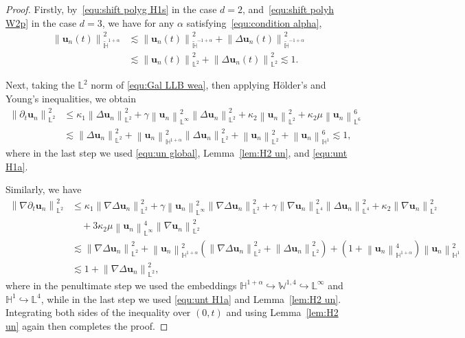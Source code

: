 \documentclass[11pt,reqno]{amsart}
\theoremstyle{definition}
\numberwithin{equation}{section}
\newcommand{\bff}{\boldsymbol}
\newcommand{\bb}{\mathbb}
\newcommand{\leqs}{\lesssim}
\newcommand{\pa}{\partial}
\newcommand{\nn}{\nonumber}
\newcommand{\norm}[2]{\left\|{#1}\right\|_{#2}}
\begin{document}
\begin{proof}
Firstly, by~\eqref{equ:shift polyg H1s} in the case $d=2$, and~\eqref{equ:shift polyh W2p} in the case $d=3$, we have for any $\alpha$ satisfying~\eqref{equ:condition alpha},
\begin{align}\label{equ:unt H1a}
	\norm{\bff{u}_n(t)}{\widetilde{\bb{H}}^{1+\alpha}}^2
	&\lesssim 
	\norm{\bff{u}_n(t)}{\widetilde{\bb{H}}^{-1+\alpha}}^2
	+
	\norm{\Delta \bff{u}_n(t)}{\widetilde{\bb{H}}^{-1+\alpha}}^2
	\nn\\
	&\lesssim
	\norm{\bff{u}_n(t)}{\bb{L}^2}^2
	+
	\norm{\Delta \bff{u}_n(t)}{\bb{L}^2}^2
	\leqs 1.
\end{align}

Next, taking the $\bb{L}^2$ norm of \eqref{equ:Gal LLB wea}, then applying H\"older's and Young's inequalities, we obtain
\begin{align*}
	\norm{\pa_t \bff{u}_n}{\bb{L}^2}^2
	&\leq
	\kappa_1 \norm{\Delta \bff{u}_n}{\bb{L}^2}^2
	+
	\gamma \norm{\bff{u}_n}{\bb{L}^\infty}^2 \norm{\Delta \bff{u}_n}{\bb{L}^2}^2
	+
	\kappa_2 \norm{\bff{u}_n}{\bb{L}^2}^2
	+
	\kappa_2 \mu \norm{\bff{u}_n}{\bb{L}^6}^6
	\\
	&\leqs
	\norm{\Delta \bff{u}_n}{\bb{L}^2}^2 + \norm{\bff{u}_n}{\bb{H}^{1+\alpha}}^2 \norm{\Delta \bff{u}_n}{\bb{L}^2}^2
	+ \norm{\bff{u}_n}{\bb{L}^2}^2 + \norm{\bff{u}_n}{\bb{H}^1}^6
	\leqs
	1,
\end{align*}
where in the last step we used \eqref{equ:un global}, Lemma~\ref{lem:H2 un}, and \eqref{equ:unt H1a}.

Similarly, we have
\begin{align*}
	\norm{\nabla \pa_t \bff{u}_n}{\bb{L}^2}^2
	&\leq
	\kappa_1 \norm{\nabla \Delta \bff{u}_n}{\bb{L}^2}^2
	+
	\gamma \norm{\bff{u}_n}{\bb{L}^\infty}^2 \norm{\nabla\Delta \bff{u}_n}{\bb{L}^2}^2
	+
	\gamma \norm{\nabla \bff{u}_n}{\bb{L}^4}^2 \norm{\Delta \bff{u}_n}{\bb{L}^4}^2
	+
	\kappa_2 \norm{\nabla\bff{u}_n}{\bb{L}^2}^2
	\\
	&\quad
	+
	3\kappa_2 \mu \norm{\bff{u}_n}{\bb{L}^\infty}^4
	\norm{\nabla \bff{u}_n}{\bb{L}^2}^2
	\\
	&\leqs
	\norm{\nabla \Delta \bff{u}_n}{\bb{L}^2}^2 + \norm{\bff{u}_n}{\bb{H}^{1+\alpha}}^2 \left( \norm{\nabla \Delta \bff{u}_n}{\bb{L}^2}^2+ \norm{\Delta \bff{u}_n}{\bb{L}^2}^2\right)
	+ \left(1+ \norm{\bff{u}_n}{\bb{H}^{1+\alpha}}^4 \right)  \norm{\bff{u}_n}{\bb{H}^1}^2
	\\
	&\leqs
	1+ \norm{\nabla\Delta \bff{u}_n}{\bb{L}^2}^2,
\end{align*}
where in the penultimate step we used the embeddings $\bb{H}^{1+\alpha} \hookrightarrow \bb{W}^{1,4} \hookrightarrow \bb{L}^\infty$ and $\bb{H}^1\hookrightarrow \bb{L}^4$, while in the last step we used \eqref{equ:unt H1a} and Lemma~\ref{lem:H2 un}. Integrating both sides of the inequality over $(0,t)$ and using Lemma~\ref{lem:H2 un} again then completes the proof.
\end{proof}
\end{document}
